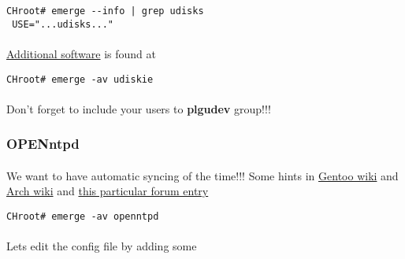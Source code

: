 \documentclass[10pt,a4paper]{article}
\begin{document}
                    \begin{lstlisting}[style=BashInputCHRoot]
 CHroot# emerge --info | grep udisks
 USE="...udisks..."
                    \end{lstlisting}

                    \paragraph{} \href{https://wiki.gentoo.org/wiki/Udisks#Emerge}{Additional software} is found at

                    \begin{lstlisting}[style=BashInputCHRoot]
 CHroot# emerge -av udiskie
                    \end{lstlisting}

                    \paragraph{} Don't forget to include your users to \textbf{plgudev} group!!!
                
                \newpage
                \subsubsection{OPENntpd}
                    
                    \paragraph{} We want to have automatic syncing of the time!!! Some hints in \href{https://wiki.gentoo.org/wiki/OpenNTPD}{Gentoo wiki} and \href{https://wiki.archlinux.org/index.php/OpenNTPD}{Arch wiki} and \href{https://forums.gentoo.org/viewtopic-p-8003072.html?sid=9f71ccb3c1b6c9b2afb28070af45549c}{this particular forum entry}
                    
                    \begin{lstlisting}[style=BashInputCHRoot]
 CHroot# emerge -av openntpd
                    \end{lstlisting}
                    
                    \paragraph{} Lets edit the config file by adding some 
                    
                    
                    
\end{document}
